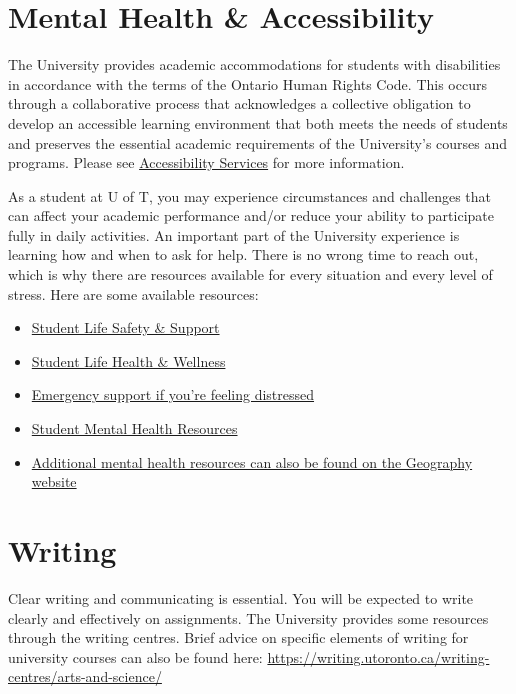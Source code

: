 \documentclass[11pt]{article}
\begin{document}
	
	\section*{Mental Health \& Accessibility}
	
	The University provides academic accommodations for students with disabilities in accordance with the terms of the Ontario Human Rights Code. This occurs through a collaborative process that acknowledges a collective obligation to develop an accessible learning environment that both meets the needs of students and preserves the essential academic requirements of the University's courses and programs. Please see \href{https://studentlife.utoronto.ca/department/accessibility-services/}{Accessibility Services} for more information.
	
	As a student at U of T, you may experience circumstances and challenges that can affect your academic performance and/or reduce your ability to participate fully in daily activities. An important part of the University experience is learning how and when to ask for help. There is no wrong time to reach out, which is why there are resources available for every situation and every level of stress. Here are some available resources:
	
	\begin{itemize}
		
		
		\item \href{https://safety.utoronto.ca/}{Student Life Safety \& Support}
		\item \href{https://studentlife.utoronto.ca/department/health-wellness/}{Student Life Health \& Wellness}
		\item \href{https://studentlife.utoronto.ca/task/support-when-you-feel-distressed/}{Emergency support if you’re feeling distressed}
		
		\item \href{https://mentalhealth.utoronto.ca/}{Student Mental Health Resources}
		
		\item  \href{https://geography.utoronto.ca/department/mental-health-resources/}{Additional mental health resources can also be found on the Geography website}
	\end{itemize}

	
	\section*{Writing}
	
	Clear writing and communicating is essential. You will be expected to write clearly and effectively on
	assignments. The University provides some resources through the writing centres. Brief advice on
	specific elements of writing for university courses can also be found here:	
	\url{https://writing.utoronto.ca/writing-centres/arts-and-science/}
	
\end{document}
